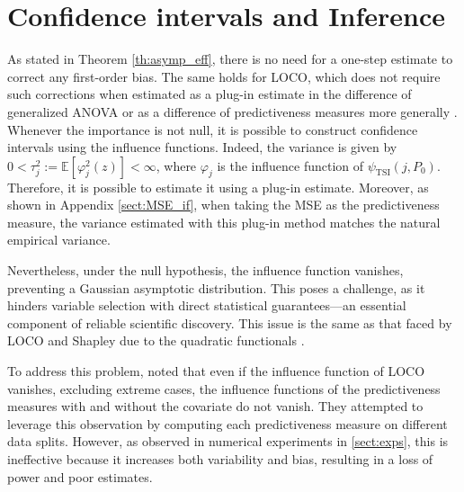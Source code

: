 \documentclass{article}
\theoremstyle{plain}
\theoremstyle{definition}
\theoremstyle{remark}
\begin{document}
\section{Confidence intervals and Inference}\label{subsec:inference}
%
As stated in Theorem \ref{th:asymp_eff}, there is no need for a one-step estimate to correct any first-order bias. 
%
The same holds for LOCO, which does not require such corrections when estimated as a plug-in estimate in the difference of generalized ANOVA \cite{williamson2021} or as a difference of predictiveness measures more generally \cite{williamson2023general}. 
%
Whenever the importance is not null, it is possible to construct confidence intervals using the influence functions. 
%
Indeed, the variance is given by $0 < \tau_j^2 := \mathbb{E}[\varphi_j^2(z)] < \infty$, where $\varphi_j$ is the influence function of $\psi_\mathrm{TSI}(j, P_0)$. 
%
Therefore, it is possible to estimate it using a plug-in estimate. %
%
Moreover, as shown in Appendix \ref{sect:MSE_if}, when taking the MSE as the predictiveness measure, the variance estimated with this plug-in method matches the natural empirical variance. 

Nevertheless, under the null hypothesis, the influence function vanishes, preventing a Gaussian asymptotic distribution. This poses a challenge, as it hinders variable selection with direct statistical guarantees—an essential component of reliable scientific discovery.
%
This issue is the same as that faced by LOCO and Shapley due to the quadratic functionals \cite{locoVSShapley}.

To address this problem, \citet{williamson2023general} noted that even if the influence function of LOCO vanishes, excluding extreme cases, the influence functions of the predictiveness measures with and without the covariate do not vanish. 
%
They attempted to leverage this observation by computing each predictiveness measure on different data splits. 
%
However, as observed in numerical experiments in \cref{sect:exps}, this is ineffective because it increases both variability and bias, resulting in a loss of power and poor estimates.

\end{document}
